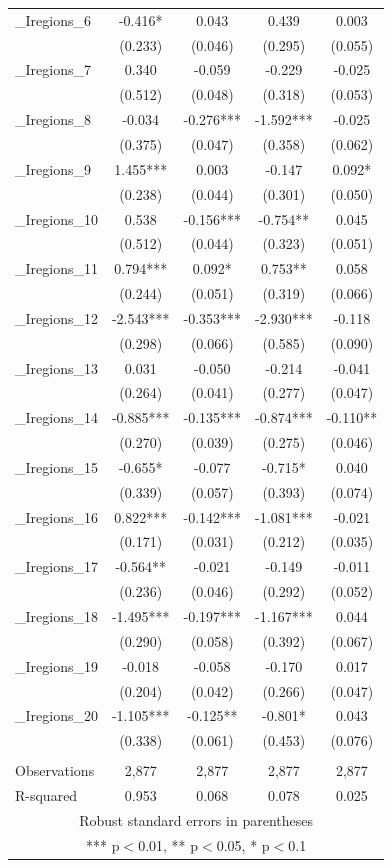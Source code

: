 \documentclass[]{article}
\begin{document}
\begin{tabular}{lcccc}
\_Iregions\_6 & -0.416* & 0.043 & 0.439 & 0.003 \\
 & (0.233) & (0.046) & (0.295) & (0.055) \\
\_Iregions\_7 & 0.340 & -0.059 & -0.229 & -0.025 \\
 & (0.512) & (0.048) & (0.318) & (0.053) \\
\_Iregions\_8 & -0.034 & -0.276*** & -1.592*** & -0.025 \\
 & (0.375) & (0.047) & (0.358) & (0.062) \\
\_Iregions\_9 & 1.455*** & 0.003 & -0.147 & 0.092* \\
 & (0.238) & (0.044) & (0.301) & (0.050) \\
\_Iregions\_10 & 0.538 & -0.156*** & -0.754** & 0.045 \\
 & (0.512) & (0.044) & (0.323) & (0.051) \\
\_Iregions\_11 & 0.794*** & 0.092* & 0.753** & 0.058 \\
 & (0.244) & (0.051) & (0.319) & (0.066) \\
\_Iregions\_12 & -2.543*** & -0.353*** & -2.930*** & -0.118 \\
 & (0.298) & (0.066) & (0.585) & (0.090) \\
\_Iregions\_13 & 0.031 & -0.050 & -0.214 & -0.041 \\
 & (0.264) & (0.041) & (0.277) & (0.047) \\
\_Iregions\_14 & -0.885*** & -0.135*** & -0.874*** & -0.110** \\
 & (0.270) & (0.039) & (0.275) & (0.046) \\
\_Iregions\_15 & -0.655* & -0.077 & -0.715* & 0.040 \\
 & (0.339) & (0.057) & (0.393) & (0.074) \\
\_Iregions\_16 & 0.822*** & -0.142*** & -1.081*** & -0.021 \\
 & (0.171) & (0.031) & (0.212) & (0.035) \\
\_Iregions\_17 & -0.564** & -0.021 & -0.149 & -0.011 \\
 & (0.236) & (0.046) & (0.292) & (0.052) \\
\_Iregions\_18 & -1.495*** & -0.197*** & -1.167*** & 0.044 \\
 & (0.290) & (0.058) & (0.392) & (0.067) \\
\_Iregions\_19 & -0.018 & -0.058 & -0.170 & 0.017 \\
 & (0.204) & (0.042) & (0.266) & (0.047) \\
\_Iregions\_20 & -1.105*** & -0.125** & -0.801* & 0.043 \\
 & (0.338) & (0.061) & (0.453) & (0.076) \\
 &  &  &  &  \\
Observations & 2,877 & 2,877 & 2,877 & 2,877 \\
 R-squared & 0.953 & 0.068 & 0.078 & 0.025 \\ \hline
\multicolumn{5}{c}{ Robust standard errors in parentheses} \\
\multicolumn{5}{c}{ *** p$<$0.01, ** p$<$0.05, * p$<$0.1} \\
\end{tabular}
\end{document}
